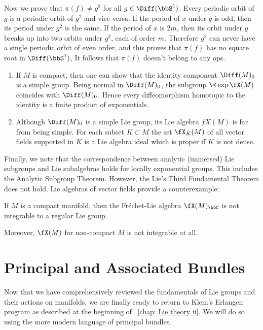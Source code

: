 \begin{example}
    Now we prove that $\pi(f)\neq g^2$ for all $g\in\Diff(\bbS^1)$. Every periodic orbit of $g$ is a periodic  orbit of $g^2$ and vice versa. If the period of $x$ under $g$ is odd, then its period under $g^2$ is the same. If the period of $x$ is $2m$, then its orbit under $g$ breaks up into two orbits under $g^2$, each of order $m$. Therefore $g^2$ can never have a single periodic orbit of even order, and this proves that $\pi(f)$ has no square root in $\Diff(\bbS^1)$, It follows that $\pi(f)$ doesn't belong to any \gls{ops}.
\end{example}

\begin{rem}
    \begin{enumerate}[label=(\alph*)]
        \item If $M$ is compact, then one can show that the identity component $\Diff(M)_0$ is a simple group. Being normal in $\Diff(M)_0$, the subgroup $\<\exp\fX(M)\>$ coincides with $\Diff(M)_0$. Hence every diffeomorphism homotopic to the identity is a finite product of exponentials.
        \item  Although $\Diff(M)_0$ is a simple Lie group, its Lie algebra $fX(M)$ is far from being simple. For each subset $K\subset M$ the set $\fX_K(M)$ of all vector fields supported in $K$ is a Lie algebra ideal which is proper if $K$ is not dense.
    \end{enumerate}
\end{rem}

Finally, we note that the correspondence between analytic (immersed) Lie subgroups and Lie subalgebras holds for locally exponential groups. This includes the Analytic Subgroup Theorem. However, the Lie's Third Fundamental Theorem does not hold. Lie algebras of vector fields provide a counterexample:
\begin{thm}[Lempert]
    If $M$ is a compact manifold, then the Fr\'echet-Lie algebra $\fX(M)_\bbC$ is not integrable to a regular Lie group.
\end{thm}
Moreover, $\fX(M)$ for non-compact $M$ is not integrable at all.







\clearpage 
\chapter{Principal and Associated Bundles}\label{ch pfb}

    Now that we have comprehensively reviewed the fundamentals of Lie groups and their actions on manifolds, we are finally ready to return to Klein's Erlangen program as described at the beginning of \Chap~\ref{chap: Lie theory ii}. We will do so using the more modern language of principal bundles.


